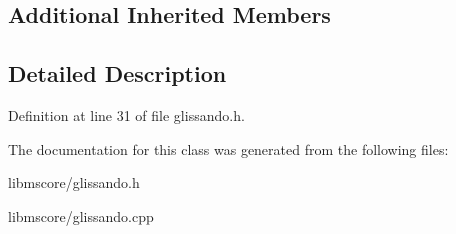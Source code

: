 \subsection*{Additional Inherited Members}


\subsection{Detailed Description}


Definition at line 31 of file glissando.\+h.



The documentation for this class was generated from the following files\+:\begin{DoxyCompactItemize}
\item 
libmscore/glissando.\+h\item 
libmscore/glissando.\+cpp\end{DoxyCompactItemize}
